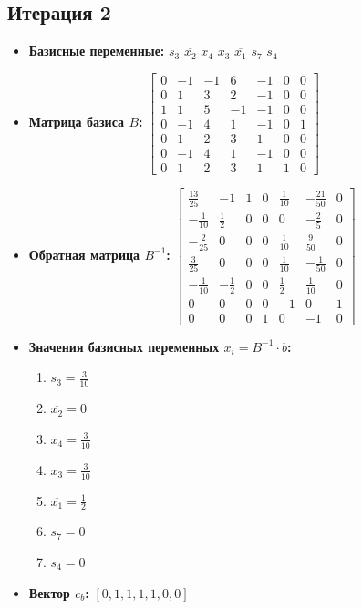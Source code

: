 \begin{itemize}
\subsection*{Итерация 2}
\begin{itemize}
\item \textbf{Базисные переменные:}
$s_3$
$\overline{x_2}$
$x_4$
$x_3$
$\overline{x_1}$
$s_7$
$s_4$
\item \textbf{Матрица базиса $B$:}
$\left[\begin{matrix}0 & -1 & -1 & 6 & -1 & 0 & 0\\0 & 1 & 3 & 2 & -1 & 0 & 0\\1 & 1 & 5 & -1 & -1 & 0 & 0\\0 & -1 & 4 & 1 & -1 & 0 & 1\\0 & 1 & 2 & 3 & 1 & 0 & 0\\0 & -1 & 4 & 1 & -1 & 0 & 0\\0 & 1 & 2 & 3 & 1 & 1 & 0\end{matrix}\right]$
\item \textbf{Обратная матрица $B^{-1}$:}
$\left[\begin{matrix}\frac{13}{25} & -1 & 1 & 0 & \frac{1}{10} & - \frac{21}{50} & 0\\- \frac{1}{10} & \frac{1}{2} & 0 & 0 & 0 & - \frac{2}{5} & 0\\- \frac{2}{25} & 0 & 0 & 0 & \frac{1}{10} & \frac{9}{50} & 0\\\frac{3}{25} & 0 & 0 & 0 & \frac{1}{10} & - \frac{1}{50} & 0\\- \frac{1}{10} & - \frac{1}{2} & 0 & 0 & \frac{1}{2} & \frac{1}{10} & 0\\0 & 0 & 0 & 0 & -1 & 0 & 1\\0 & 0 & 0 & 1 & 0 & -1 & 0\end{matrix}\right]$
\item \textbf{Значения базисных переменных $ x_i = B^{-1} \cdot b$:}
\begin{enumerate}
\item $s_3 = \frac{3}{10}$
\item $\overline{x_2} = 0$
\item $x_4 = \frac{3}{10}$
\item $x_3 = \frac{3}{10}$
\item $\overline{x_1} = \frac{1}{2}$
\item $s_7 = 0$
\item $s_4 = 0$
\end{enumerate}
\item \textbf{Вектор $c_b$:}
$[0, 1, 1, 1, 1, 0, 0]$

\end{itemize}
\end{itemize}
